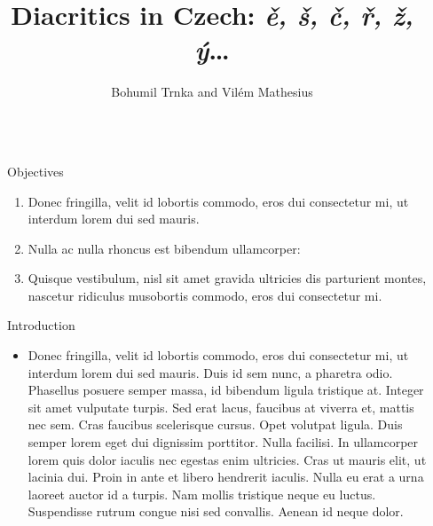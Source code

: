 \documentclass[final,hyperref={pdfpagelabels=false}]{beamer}
\title{Diacritics in Czech: \emph{ě, š, č, ř, ž, ý}\ldots} %
\author{Bohumil Trnka and Vilém Mathesius} %
\institute{Institute of the Czech National Corpus, Faculty of Arts, Charles
  University in Prague} %
\begin{document}
\begin{frame}[t]

\begin{columns}[t] %

\begin{column}{.03\textwidth}\end{column} %

\begin{column}{.465\textwidth} %


\begin{ctblock}{Objectives}

\begin{enumerate}
\item Donec fringilla, velit id lobortis commodo, eros dui consectetur mi, ut interdum lorem dui sed mauris.
\item Nulla ac nulla rhoncus est bibendum ullamcorper:
\item Quisque vestibulum, nisl sit amet gravida ultricies dis parturient montes, nascetur ridiculus musobortis commodo, eros dui consectetur mi.
\end{enumerate}

\end{ctblock}


\begin{ctblock}{Introduction}

\begin{itemize}
\item Donec fringilla, velit id lobortis commodo, eros dui consectetur mi, ut interdum lorem dui sed mauris. Duis id sem nunc, a pharetra odio. Phasellus posuere \alert{semper massa}, id bibendum ligula tristique at. Integer sit amet vulputate turpis. Sed erat lacus, faucibus at viverra et, mattis nec sem. Cras faucibus \alert{scelerisque} cursus. Opet volutpat ligula. Duis semper lorem eget dui dignissim porttitor. Nulla facilisi. In ullamcorper lorem quis dolor iaculis nec egestas enim ultricies. Cras ut mauris elit, ut lacinia dui. Proin in ante et libero hendrerit iaculis. Nulla eu erat a urna laoreet auctor id a turpis. Nam mollis tristique neque eu luctus. Suspendisse rutrum congue nisi sed convallis. Aenean id neque dolor.
\end{itemize}


\end{ctblock}
\end{column}
\end{columns}
\end{frame}
\end{document}
